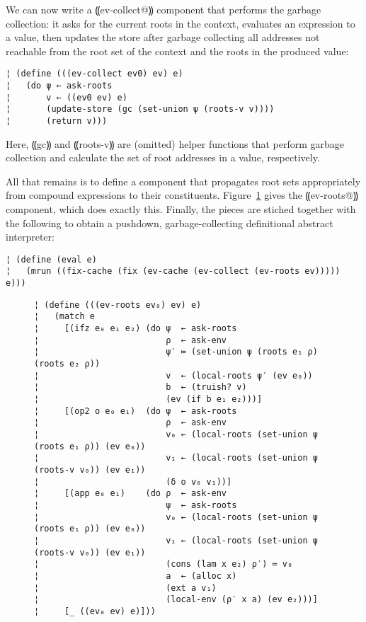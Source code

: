 We can now write a ⸨ev-collect@⸩ component that performs the garbage
collection: it asks for the current roots in the context, evaluates an
expression to a value, then updates the store after garbage collecting
all addresses not reachable from the root set of the context and the
roots in the produced value:
\begin{lstlisting}
¦ (define (((ev-collect ev0) ev) e)
¦   (do ψ ← ask-roots
¦       v ← ((ev0 ev) e)
¦       (update-store (gc (set-union ψ (roots-v v))))
¦       (return v)))
\end{lstlisting}
Here, ⸨gc⸩ and ⸨roots-v⸩ are (omitted) helper functions that perform
garbage collection and calculate the set of root addresses in a value,
respectively.

All that remains is to define a component that propagates root sets
appropriately from compound expressions to their constituents.
Figure~\ref{f:gc-collect-roots} gives the ⸨ev-roots@⸩ component, which
does exactly this.
%
Finally, the pieces are stiched together with the following to obtain
a pushdown, garbage-collecting definitional abstract interpreter:
\begin{lstlisting}
¦ (define (eval e)
¦   (mrun ((fix-cache (fix (ev-cache (ev-collect (ev-roots ev))))) e)))
\end{lstlisting}


\begin{figure} %
\begin{mdframed}
\figskip{}
\begin{lstlisting}
¦ (define (((ev-roots ev₀) ev) e)
¦   (match e
¦     [(ifz e₀ e₁ e₂) (do ψ  ← ask-roots
¦                         ρ  ← ask-env
¦                         ψ′ ≔ (set-union ψ (roots e₁ ρ) (roots e₂ ρ))
¦                         v  ← (local-roots ψ′ (ev e₀))
¦                         b  ← (truish? v)
¦                         (ev (if b e₁ e₂)))]
¦     [(op2 o e₀ e₁)  (do ψ  ← ask-roots
¦                         ρ  ← ask-env
¦                         v₀ ← (local-roots (set-union ψ (roots e₁ ρ)) (ev e₀))
¦                         v₁ ← (local-roots (set-union ψ (roots-v v₀)) (ev e₁))
¦                         (δ o v₀ v₁))]
¦     [(app e₀ e₁)    (do ρ  ← ask-env
¦                         ψ  ← ask-roots
¦                         v₀ ← (local-roots (set-union ψ (roots e₁ ρ)) (ev e₀))
¦                         v₁ ← (local-roots (set-union ψ (roots-v v₀)) (ev e₁))
¦                         (cons (lam x e₂) ρ′) ≔ v₀
¦                         a  ← (alloc x)
¦                         (ext a v₁)
¦                         (local-env (ρ′ x a) (ev e₂)))]
¦     [_ ((ev₀ ev) e)]))
\end{lstlisting}
\label{f:gc-collect-roots}
\end{mdframed}
\end{figure} %




